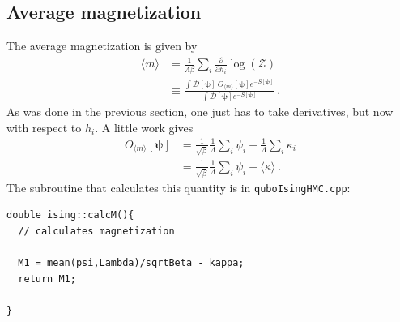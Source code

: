 \documentclass[11pt]{article}
\begin{document}
\subsection{Average magnetization}
The average magnetization is given by
\begin{align}
\langle m\rangle&=\frac{1}{\Lambda \beta}\sum_i \frac{\partial}{\partial h_i} \log (\mathcal{Z})\\
&\equiv\frac{\int\mathcal{D}[\bm\psi]\ O_{\langle m\rangle}[\bm\psi]e^{-S[\bm\psi]}}{\int\mathcal{D}[\bm\psi]e^{-S[\bm\psi]}}\ .
\end{align}
As was done in the previous section, one just has to take derivatives, but now with respect to $h_i$.  A little work gives
\begin{align}
O_{\langle m\rangle}[\bm\psi]&=\frac{1}{\sqrt{\beta}}\frac{1}{\Lambda}\sum_i\psi_i -\frac{1}{\Lambda}\sum_i\kappa_i\nonumber\\
&=\frac{1}{\sqrt{\beta}}\frac{1}{\Lambda}\sum_i\psi_i -\langle \kappa\rangle\ .\label{eqn:m op}
\end{align}
The subroutine that calculates this quantity is in \texttt{quboIsingHMC.cpp}:
\begin{lstlisting}
double ising::calcM(){
  // calculates magnetization

  M1 = mean(psi,Lambda)/sqrtBeta - kappa;
  return M1;

}
\end{lstlisting}
\end{document}
